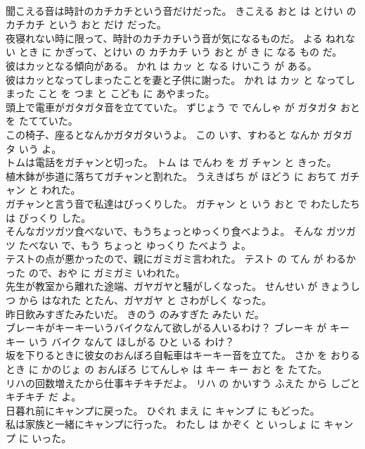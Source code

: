 \documentclass[8pt]{extreport}
\begin{document}
\begin{CJK}{UTF8}{min}
\\	聞こえる音は時計のカチカチという音だけだった。	きこえる おと は とけい の カチカチ という おと だけ だった。	
\\	夜寝れない時に限って、時計のカチカチいう音が気になるものだ。	よる ねれない とき に かぎって、とけい の カチカチ いう おと が き に なる もの だ。	
\\	彼はカッとなる傾向がある。	かれ は カッ と なる けいこう が ある。	
\\	彼はカッとなってしまったことを妻と子供に謝った。	かれ は カッ と なってしまった こと を つま と こども に あやまった。	
\\	頭上で電車がガタガタ音を立てていた。	ずじょう で でんしゃ が ガタガタ おと を たてていた。	
\\	この椅子、座るとなんかガタガタいうよ。	この いす、すわると なんか ガタガタ いう よ。	
\\	トムは電話をガチャンと切った。	トム は でんわ を ガ チャン と きった。	
\\	植木鉢が歩道に落ちてガチャンと割れた。	うえきばち が ほどう に おちて ガチャン と われた。	
\\	ガチャンと言う音で私達はびっくりした。	ガチャン と いう おと で わたしたち は びっくり した。	
\\	そんなガツガツ食べないで、もうちょっとゆっくり食べようよ。	そんな ガツガツ たべない で、もう ちょっと ゆっくり たべよう よ。	
\\	テストの点が悪かったので、親にガミガミ言われた。	テスト の てん が わるかった ので、おや に ガミガミ いわれた。	
\\	先生が教室から離れた途端、ガヤガヤと騒がしくなった。	せんせい が きょうしつ から はなれた とたん、ガヤガヤ と さわがしく なった。	
\\	昨日飲みすぎたみたいだ。	きのう のみすぎた みたい だ。	
\\	ブレーキがキーキーいうバイクなんて欲しがる人いるわけ？	ブレーキ が キー キー いう バイク なんて ほしがる ひと いる わけ？	
\\	坂を下りるときに彼女のおんぼろ自転車はキーキー音を立てた。	さか を おりる とき に かのじょ の おんぼろ じてんしゃ は キー キー おと を たてた。	
\\	リハの回数増えたから仕事キチキチだよ。	リハ の かいすう ふえた から しごと キチキチ だ よ。	
\\	日暮れ前にキャンプに戻った。	ひぐれ まえ に キャンプ に もどった。	
\\	私は家族と一緒にキャンプに行った。	わたし は かぞく と いっしょ に キャンプ に いった。	

\end{CJK}
\end{document}

